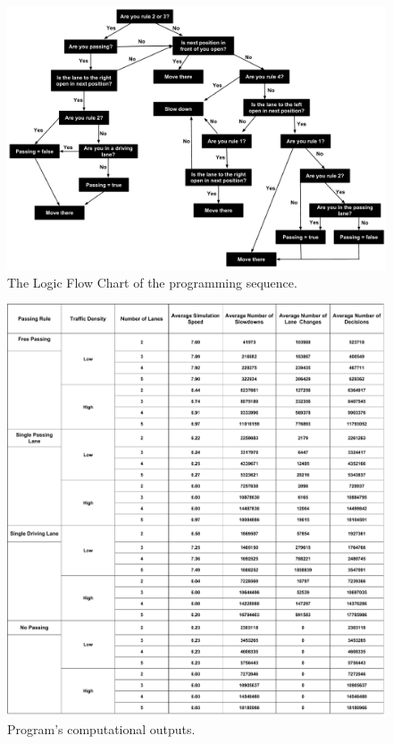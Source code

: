 \documentclass{amsart}
\begin{document}
	\begin{figure}[H]
	\begin{center}
	\includegraphics[scale=0.4]{MCM-LogicalFlowChart.pdf}
	\caption{The Logic Flow Chart of the programming sequence.}
	\renewcommand{\figurename}{}
	\end{center}
	\end{figure}
	
	\begin{figure}[H]
	\begin{center}
	\includegraphics[scale=0.3]{MCMDataSummary}
	\caption{Program's computational outputs.}
	\renewcommand{\figurename}{}
	\end{center}
	\end{figure}
	
\end{document}
